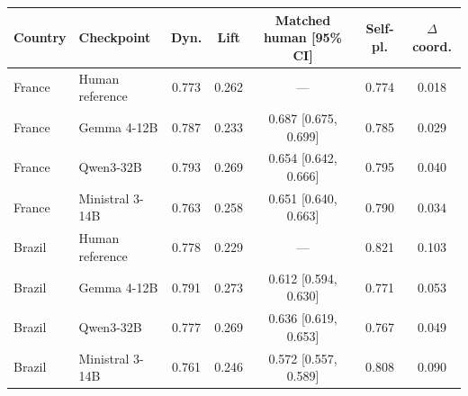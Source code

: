 \begin{tabular}{llccccc}
\toprule
Country & Checkpoint & Dyn. & Lift & Matched human [95\% CI] & Self-pl. & $\Delta$ coord. \\
\midrule
France & Human reference & 0.773 & 0.262 & --- & 0.774 & 0.018 \\
France & Gemma 4-12B & 0.787 & 0.233 & 0.687 [0.675, 0.699] & 0.785 & 0.029 \\
France & Qwen3-32B & 0.793 & 0.269 & 0.654 [0.642, 0.666] & 0.795 & 0.040 \\
France & Ministral 3-14B & 0.763 & 0.258 & 0.651 [0.640, 0.663] & 0.790 & 0.034 \\
Brazil & Human reference & 0.778 & 0.229 & --- & 0.821 & 0.103 \\
Brazil & Gemma 4-12B & 0.791 & 0.273 & 0.612 [0.594, 0.630] & 0.771 & 0.053 \\
Brazil & Qwen3-32B & 0.777 & 0.269 & 0.636 [0.619, 0.653] & 0.767 & 0.049 \\
Brazil & Ministral 3-14B & 0.761 & 0.246 & 0.572 [0.557, 0.589] & 0.808 & 0.090 \\
\bottomrule
\end{tabular}
